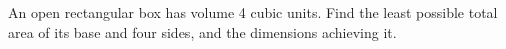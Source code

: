 An open rectangular box has volume 4 cubic units. Find the least possible total area of its base and four sides, and the dimensions achieving it.
